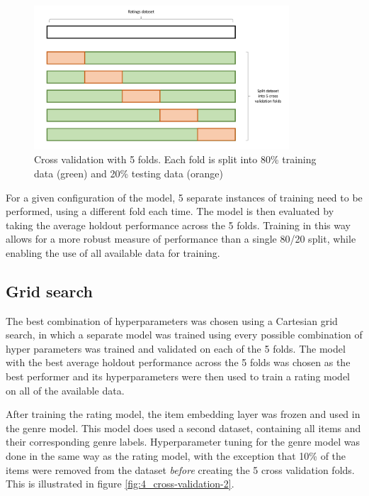 \begin{figure}[H]
\centering
\includegraphics[width=0.85\textwidth]{Figures/4_cross-validation.pdf}
\decoRule
\caption[Cross validation folds]{Cross validation with 5 folds. Each fold is split into 80\% training data (green) and 20\% testing data (orange)}
\label{fig:4_cross-validation}
\end{figure}

For a given configuration of the model, 5 separate instances of training need to be performed, using a different fold each time. The model is then evaluated by taking the average holdout performance across the 5 folds. Training in this way allows for a more robust measure of performance than a single 80/20 split, while enabling the use of all available data for training.

\subsection{Grid search}
The best combination of hyperparameters was chosen using a Cartesian grid search, in which a separate model was trained using every possible combination of hyper parameters was trained and validated on each of the 5 folds. The model with the best average holdout performance across the 5 folds was chosen as the best performer and its hyperparameters were then used to train a rating model on all of the available data.

After training the rating model, the item embedding layer was frozen and used in the genre model. This model does used a second dataset, containing all items and their corresponding genre labels. Hyperparameter tuning for the genre model was done in the same way as the rating model, with the exception that 10\% of the items were removed from the dataset \textit{before} creating the 5 cross validation folds. This is illustrated in figure \ref{fig:4_cross-validation-2}.

